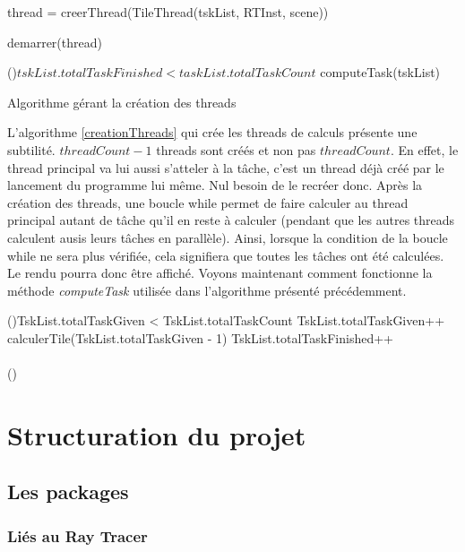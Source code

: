 \documentclass[11pt]{article}
\begin{document}
\begin{algorithm}[H]
	
	{
		thread = creerThread(TileThread(tskList, RTInst, scene))

		demarrer(thread)
	}

	\While(){$tskList.totalTaskFinished < taskList.totalTaskCount$}
	{
		computeTask(tskList)
	}

	\caption{Algorithme gérant la création des threads}
	\label{creationThreads}
\end{algorithm}

L'algorithme \ref{creationThreads} qui crée les threads de calculs présente une subtilité. $threadCount-1$ threads sont créés et non pas $threadCount$. En effet, le thread principal va lui aussi s'atteler à la tâche, c'est un thread déjà créé par le lancement du programme lui même. Nul besoin de le recréer donc. Après la création des threads, une boucle while permet de faire calculer au thread principal autant de tâche qu'il en reste à calculer (pendant que les autres threads calculent ausis leurs tâches en parallèle). Ainsi, lorsque la condition de la boucle while ne sera plus vérifiée, cela signifiera que toutes les tâches ont été calculées. Le rendu pourra donc être affiché. Voyons maintenant comment fonctionne la méthode \textit{computeTask} utilisée dans l'algorithme présenté précédemment.

\begin{algorithm}
	
	\If(){TskList.totalTaskGiven < TskList.totalTaskCount}
	{
		TskList.totalTaskGiven++
		calculerTile(TskList.totalTaskGiven - 1)
		TskList.totalTaskFinished++\\\hfill\\

	}
	\Else()
	{
	}
	
\end{algorithm}

\section{Structuration du projet}
\subsection{Les packages}
\subsubsection{Liés au Ray Tracer}
\end{document}
